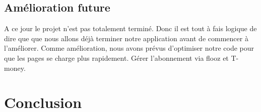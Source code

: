 \documentclass[12pt,a4paper]{article}
\begin{document}
\subsection{Amélioration future}
A ce jour le projet n'est pas totalement terminé. Donc il est tout à fais logique de dire que
que nous allons déjà terminer notre application avant de commencer à l'améliorer.
Comme amélioration, nous avons prévus d'optimiser notre code pour que les pages se charge 
plus rapidement. Gérer l'abonnement via flooz et T-money.

\section{Conclusion}
\end{document}
